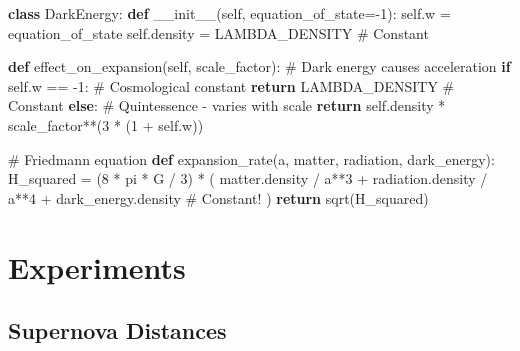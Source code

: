 \documentclass[
  11pt,
  letterpaper,
  twoside,
  openright]{book}
\newenvironment{Shaded}{\begin{snugshade}}{\end{snugshade}}
\newcommand{\CommentTok}[1]{\textcolor[rgb]{0.37,0.37,0.37}{#1}}
\newcommand{\ControlFlowTok}[1]{\textcolor[rgb]{0.00,0.23,0.31}{\textbf{#1}}}
\newcommand{\DecValTok}[1]{\textcolor[rgb]{0.68,0.00,0.00}{#1}}
\newcommand{\FunctionTok}[1]{\textcolor[rgb]{0.28,0.35,0.67}{#1}}
\newcommand{\KeywordTok}[1]{\textcolor[rgb]{0.00,0.23,0.31}{\textbf{#1}}}
\newcommand{\NormalTok}[1]{\textcolor[rgb]{0.00,0.23,0.31}{#1}}
\newcommand{\OperatorTok}[1]{\textcolor[rgb]{0.37,0.37,0.37}{#1}}
\newcommand{\VariableTok}[1]{\textcolor[rgb]{0.07,0.07,0.07}{#1}}
\begin{document}
\begin{Shaded}
\begin{Highlighting}[]
\KeywordTok{class}\NormalTok{ DarkEnergy:}
    \KeywordTok{def} \FunctionTok{\_\_init\_\_}\NormalTok{(}\VariableTok{self}\NormalTok{, equation\_of\_state}\OperatorTok{={-}}\DecValTok{1}\NormalTok{):}
        \VariableTok{self}\NormalTok{.w }\OperatorTok{=}\NormalTok{ equation\_of\_state}
        \VariableTok{self}\NormalTok{.density }\OperatorTok{=}\NormalTok{ LAMBDA\_DENSITY  }\CommentTok{\# Constant}

    \KeywordTok{def}\NormalTok{ effect\_on\_expansion(}\VariableTok{self}\NormalTok{, scale\_factor):}
        \CommentTok{\# Dark energy causes acceleration}
        \ControlFlowTok{if} \VariableTok{self}\NormalTok{.w }\OperatorTok{==} \OperatorTok{{-}}\DecValTok{1}\NormalTok{:}
            \CommentTok{\# Cosmological constant}
            \ControlFlowTok{return}\NormalTok{ LAMBDA\_DENSITY  }\CommentTok{\# Constant}
        \ControlFlowTok{else}\NormalTok{:}
            \CommentTok{\# Quintessence {-} varies with scale}
            \ControlFlowTok{return} \VariableTok{self}\NormalTok{.density }\OperatorTok{*}\NormalTok{ scale\_factor}\OperatorTok{**}\NormalTok{(}\DecValTok{3} \OperatorTok{*}\NormalTok{ (}\DecValTok{1} \OperatorTok{+} \VariableTok{self}\NormalTok{.w))}

\CommentTok{\# Friedmann equation}
\KeywordTok{def}\NormalTok{ expansion\_rate(a, matter, radiation, dark\_energy):}
\NormalTok{    H\_squared }\OperatorTok{=}\NormalTok{ (}\DecValTok{8} \OperatorTok{*}\NormalTok{ pi }\OperatorTok{*}\NormalTok{ G }\OperatorTok{/} \DecValTok{3}\NormalTok{) }\OperatorTok{*}\NormalTok{ (}
\NormalTok{        matter.density }\OperatorTok{/}\NormalTok{ a}\OperatorTok{**}\DecValTok{3} \OperatorTok{+}
\NormalTok{        radiation.density }\OperatorTok{/}\NormalTok{ a}\OperatorTok{**}\DecValTok{4} \OperatorTok{+}
\NormalTok{        dark\_energy.density  }\CommentTok{\# Constant!}
\NormalTok{    )}
    \ControlFlowTok{return}\NormalTok{ sqrt(H\_squared)}
\end{Highlighting}
\end{Shaded}

\section{Experiments}\label{experiments-31}

\subsection{Supernova Distances}\label{supernova-distances}
\end{document}

